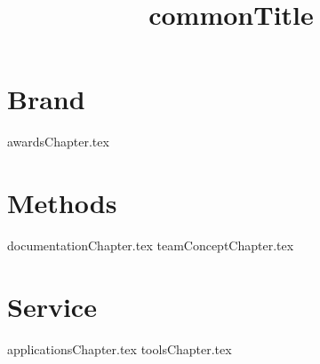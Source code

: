 \documentclass[letterpaper, 12pt]{memoir}  %
\title{ {commonTitle}}  %
\begin{document}
\frontmatter %
\maketitle %
\clearpage
\pagestyle{empty}
\tableofcontents %
\clearpage
\mainmatter %
\pagestyle{jalapenoPageStyleA} %
\part{Brand}
{awardsChapter.tex}
\part{Methods}
{documentationChapter.tex}
{teamConceptChapter.tex}
\part{Service}
{applicationsChapter.tex}
{toolsChapter.tex}
\end{document}
